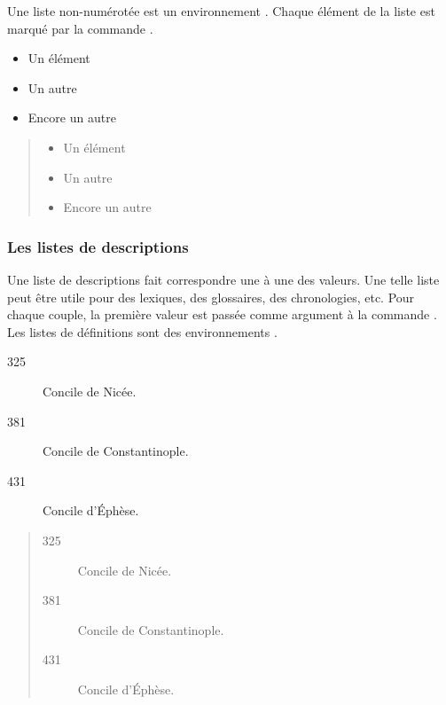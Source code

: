 Une liste non-numérotée est un environnement .
Chaque élément de la liste est marqué par la commande .

\begin{latexcode}
\begin{itemize}
    \item Un élément
    \item Un autre
    \item Encore un autre
\end{itemize}
\end{latexcode}

\begin{quotation}
\noindent\begin{itemize}
    \item Un élément
    \item Un autre
    \item Encore un autre
\end{itemize}
\end{quotation}

\subsubsection{Les listes de descriptions}

Une liste de descriptions fait correspondre une à une des valeurs. Une telle liste peut être utile pour des lexiques, des glossaires, des chronologies, etc. Pour chaque couple, la première valeur est passée comme argument à la commande . Les listes de définitions sont des environnements .


\begin{latexcode}
\begin{description}
    \item[325]Concile de Nicée.
    \item[381]Concile de Constantinople.
    \item[431]Concile d'Éphèse.
\end{description}
\end{latexcode}

\begin{quotation}
\noindent\begin{description}
    \item[325]Concile de Nicée.
    \item[381]Concile de Constantinople.
    \item[431]Concile d'Éphèse.
\end{description}
\end{quotation}

